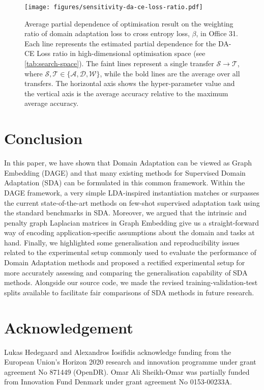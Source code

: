 \documentclass[journal]{IEEEtran}
\begin{document}
\begin{figure}
    \centering
    \texttt{[image: figures/sensitivity-da-ce-loss-ratio.pdf]}
    \caption{
    Average partial dependence of optimisation result on the weighting ratio of domain adaptation loss to cross entropy loss, $\beta$, in Office 31. 
    Each line represents the estimated partial dependence for the DA-CE Loss ratio in high-dimensional optimisation space (see \cref{tab:search-space}). The faint lines represent a single transfer $\mathcal{S} \rightarrow \mathcal{T}$, where $ \mathcal{S, T} \in \{ \mathcal{A, D, W} \}$, while the bold lines are the average over all transfers.
    The horizontal axis shows the hyper-parameter value and the vertical axis is the average accuracy relative to the maximum average accuracy.
     }
    \label{fig:sensitivity}
\end{figure}


 \section{Conclusion} \label{sec:conclusion}
In this paper, we have shown that Domain Adaptation can be viewed as Graph Embedding (DAGE) and that many existing methods for Supervised Domain Adaptation (SDA) can be formulated in this common framework. 
Within the DAGE framework, a very simple LDA-inspired instantiation matches or surpasses the current state-of-the-art methods on few-shot supervised adaptation task using the standard benchmarks in SDA.
Moreover, we argued that the intrinsic and penalty graph Laplacian matrices in Graph Embedding give us a straight-forward way of encoding application-specific assumptions about the domain and tasks at hand. 
Finally, we highlighted some generalisation and reproducibility issues related to the experimental setup commonly used to evaluate the performance of Domain Adaptation methods and proposed a rectified experimental setup for more accurately assessing and comparing the generalisation capability of SDA methods. Alongside our source code, we made the revised training-validation-test splits available to facilitate fair comparisons of SDA methods in future research. \section*{Acknowledgement}
Lukas Hedegaard and Alexandros Iosifidis acknowledge funding from the European Union’s Horizon 2020 research and innovation programme under grant agreement No 871449 (OpenDR). Omar Ali Sheikh-Omar was partially funded from Innovation Fund Denmark under grant agreement No 0153-00233A. 
 
\end{document}
